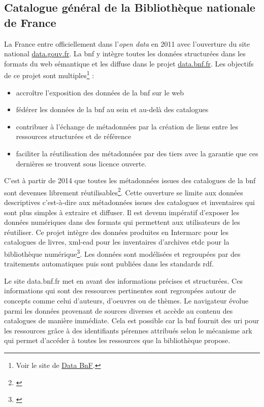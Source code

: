 \documentclass[a4paper, 12pt, twoside]{book}
\begin{document}
\subsection{Catalogue général de la Bibliothèque nationale de France}
\label{sub:BNF}
La France entre officiellement dans l'\textit{open data} en 2011 avec l'ouverture du site national \href{https://www.data.gouv.fr/fr/}{data.gouv.fr}. La \gls{bnf} y intègre toutes les données structurées dans les formats du web sémantique et les diffuse dans le projet \href{https://data.bnf.fr/}{data.bnf.fr}. Les objectifs de ce projet sont multiples\footnote{Voir le site de \href{https://data.bnf.fr/en/about}{Data BnF}.} :
\begin{itemize}
    \item accroître l'exposition des données de la \gls{bnf} sur le web
    \item fédérer les données de la \gls{bnf} au sein et au-delà des catalogues
    \item contribuer à l'échange de métadonnées par la création de liens entre les ressources structurées et de référence
    \item faciliter la réutilisation des métadonnées par des tiers avec la garantie que ces dernières se trouvent sous licence ouverte.
\end{itemize}

C'est à partir de 2014 que toutes les métadonnées issues des catalogues de la \gls{bnf} sont devenues librement réutilisables\footnote{\cite{wenz_lopen_2016}}. Cette ouverture se limite aux données descriptives c'est-à-dire aux métadonnées issues des catalogues et inventaires qui sont plus simples à extraire et diffuser. Il est devenu impératif d'exposer les données numériques dans des formats qui permettent aux utilisateurs de les réutiliser. Ce projet intègre des données produites en Intermarc pour les catalogues de livres, \gls{xml}-\gls{ead} pour les inventaires d'archives et\gls{dc} pour la bibliothèque numérique\footnote{\cite{databnf_semantic_nodate}}. Les données sont modélisées et regroupées par des traitements automatiques puis sont publiées dans les standards \gls{rdf}.

Le site data.bnf.fr met en avant des informations précises et structurées. Ces informations qui sont des ressources pertinentes sont regroupées autour de concepts comme celui d'auteurs, d'oeuvres ou de thèmes. Le navigateur évolue parmi les données provenant de sources diverses et accède au contenu des catalogues de manière immédiate. Cela est possible car la \gls{bnf} fournit des \gls{uri} pour les ressources grâce à des identifiants pérennes attribués selon le mécanisme \gls{ark} qui permet d'accéder à toutes les ressources que la bibliothèque propose.
\end{document}
